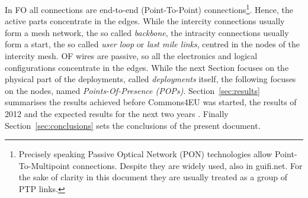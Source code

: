 In FO all connections are end-to-end (Point-To-Point) connections\footnote{Precisely speaking Passive Optical Network (PON) technologies allow Point-To-Multipoint connections. Despite they are widely used, also in guifi.net. For the sake of clarity in this document they are usually treated as a group of PTP links.}. Hence, the active parts concentrate in the edges. While the intercity connections usually form a mesh network, the so called \emph{backbone}, the intracity connections usually form a start, the so called \emph{user loop} or \emph{last mile links}, centred in the nodes of the intercity mesh. OF wires are passive, so all the electronics and logical configurations concentrate in the edges. While the next Section focuses on the physical part of the deployments, called \emph{deployments} itself, the following focuses on the nodes, named \emph{Points-Of-Presence (POPs)}. Section~\ref{sec:results} summarises the results achieved before Commons4EU was started, the results of 2012 and the expected results for the next two years . Finally Section~\ref{sec:conclusions} sets the conclusions of the present document.

